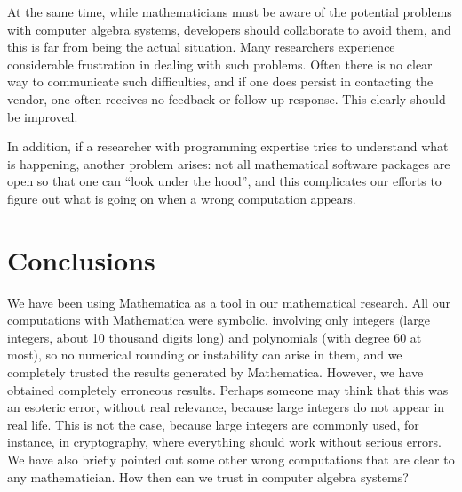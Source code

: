 \documentclass[12pt]{article}
\begin{document}
At the same time, while mathematicians must be aware of the potential problems with computer algebra systems, developers should collaborate to avoid them, and this is far from being the actual situation. Many researchers experience considerable frustration in dealing with such problems. Often there is no clear way to communicate such difficulties, and if one does persist in contacting the vendor, one often receives no feedback or follow-up response. This clearly should be improved.


In addition, if a researcher with programming expertise tries to understand what is happening, another problem arises: not all mathematical software packages are open so that one can ``look under the hood'', and this complicates our efforts to figure out what is going on when a wrong computation appears. 


\section*{Conclusions}

We have been using Mathematica as a tool in our mathematical research. All our computations with Mathematica were symbolic, involving only integers (large integers, about 10 thousand digits long) and polynomials (with degree 60 at most), so no numerical rounding or instability can arise in them, and we completely trusted the results generated by Mathematica. However, we have obtained completely erroneous results. Perhaps someone may think that this was an esoteric error, without real relevance, because large integers do not appear in real life. This is not the case, because large integers are commonly used, for instance, in cryptography, where everything should work without serious errors. We have also briefly pointed out some other wrong computations that are clear to any mathematician. How then can we trust in computer algebra systems?
\end{document}
